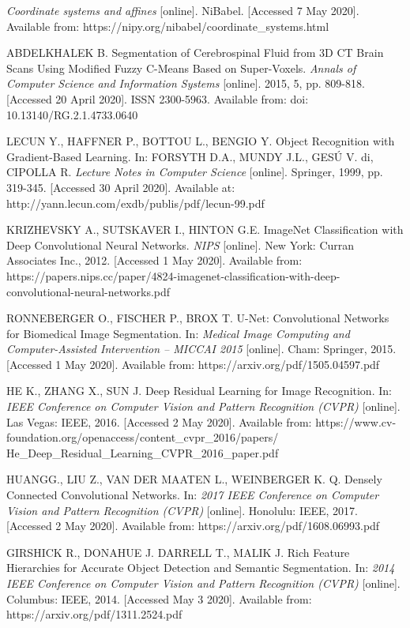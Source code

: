 \begin{thebibliography}{9}
\textit{Coordinate systems and affines} [online]. NiBabel. [Accessed 7 May 2020]. Available from: https://nipy.org/nibabel/coordinate\_systems.html

ABDELKHALEK B. Segmentation of Cerebrospinal Fluid from 3D CT Brain Scans Using Modified Fuzzy C-Means Based on Super-Voxels. \textit{Annals of Computer Science and Information Systems} [online]. 2015, 5, pp. 809-818. [Accessed 20 April 2020]. ISSN 2300-5963. Available from: doi: 10.13140/RG.2.1.4733.0640

LECUN Y., HAFFNER P., BOTTOU L., BENGIO Y. Object Recognition with Gradient-Based Learning. In: FORSYTH D.A., MUNDY J.L., GESÚ V. di, CIPOLLA R. \textit{Lecture Notes in Computer Science} [online]. Springer, 1999, pp. 319-345. [Accessed 30 April 2020]. Available at: http://yann.lecun.com/exdb/publis/pdf/lecun-99.pdf

KRIZHEVSKY A., SUTSKAVER I., HINTON G.E. ImageNet Classification with Deep Convolutional Neural Networks. \textit{NIPS} [online]. New York: Curran Associates Inc., 2012. [Accessed 1 May 2020]. Available from: https://papers.nips.cc/paper/4824-imagenet-classification-with-deep-convolutional-neural-networks.pdf

RONNEBERGER O., FISCHER P., BROX T. U-Net: Convolutional Networks for Biomedical Image Segmentation. In: \textit{Medical Image Computing and Computer-Assisted Intervention – MICCAI 2015} [online]. Cham: Springer, 2015. [Accessed 1 May 2020]. Available from: https://arxiv.org/pdf/1505.04597.pdf 

HE K., ZHANG X., SUN J. Deep Residual Learning for Image Recognition. In: \textit{IEEE Conference on Computer Vision and Pattern Recognition (CVPR)} [online]. Las Vegas: IEEE, 2016. [Accessed 2 May 2020]. Available from: https://www.cv-foundation.org/openaccess/content\_cvpr\_2016/papers/
He\_Deep\_Residual\_Learning\_CVPR\_2016\_paper.pdf

HUANGG., LIU Z., VAN DER MAATEN L., WEINBERGER K. Q. Densely Connected Convolutional Networks. In: \textit{2017 IEEE Conference on Computer Vision and Pattern Recognition (CVPR)} [online]. Honolulu: IEEE, 2017. [Accessed 2 May 2020]. Available from: https://arxiv.org/pdf/1608.06993.pdf

GIRSHICK R., DONAHUE J. DARRELL T., MALIK J. Rich Feature Hierarchies for Accurate Object Detection and Semantic Segmentation. In: \textit{2014 IEEE Conference on Computer Vision and Pattern Recognition (CVPR)} [online]. Columbus: IEEE, 2014. [Accessed May 3 2020]. Available from: https://arxiv.org/pdf/1311.2524.pdf


\end{thebibliography}
